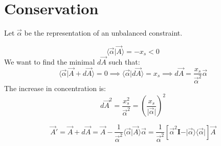 \documentclass[aps,12pt]{revtex4}
\begin{document}
\section{Conservation}

Let $\vec \alpha$ be the representation of an unbalanced constraint.

\begin{equation}
	\langle \vec \alpha \vert \vec A \rangle = - x_s < 0
\end{equation}
We want to find the minimal $d \vec A$ such that:
\begin{equation}
	\langle \vec \alpha \vert \vec A + d\vec A \rangle = 0 \implies \langle \vec \alpha \vert d \vec A \rangle = x_s \implies d \vec A = \dfrac{x_s}{\vec\alpha^2} \vec \alpha
\end{equation}
The increase in concentration is:
\begin{equation}
	d \vec A^2 = \dfrac{x_s^2}{\vec \alpha^2} = \left( \dfrac{x_s}{\vert\vec\alpha\vert}\right) ^2
\end{equation}

\begin{equation}
	\vec A ' = \vec A + d \vec A = \vec{A} - \dfrac{1}{\vec \alpha^2} \langle \vec \alpha \vert \vec A \rangle \vec \alpha 
	= \dfrac{1}{\vec \alpha^2} \left[ \vec \alpha^2 \bm I - \vert \vec \alpha \rangle \langle \vec \alpha \vert \right] \vec A
\end{equation}


%
%
 	
\end{document}
